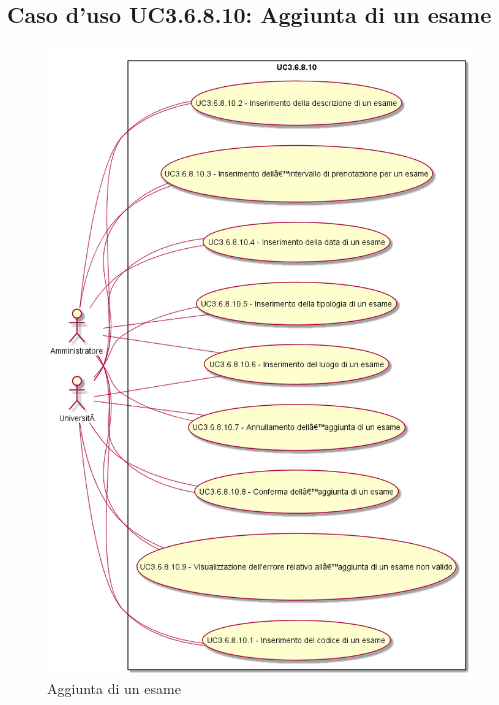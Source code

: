 \subsection{Caso d'uso \texorpdfstring{UC3.6.8.10}{UC3.6.8.10}: Aggiunta di un esame}
\begin{figure} [H]
\centering
\includegraphics[scale=0.45]{./img/UC3-6-8-10.png}
\caption{Aggiunta di un esame}\label{}
\end{figure}
